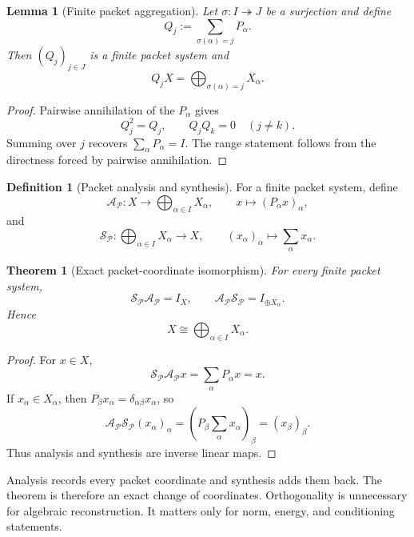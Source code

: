 \documentclass[11pt]{article}
\newtheorem{theorem}{Theorem}[section]
\newtheorem{lemma}[lemma]{Lemma}
\theoremstyle{definition}
\newtheorem{definition}[definition]{Definition}
\theoremstyle{remark}
\theoremstyle{definition}\newtheorem{example}[theorem]{Example}
\newcommand{\Pcal}{\mathcal P}
\newcommand{\RecordID}[1]{\label{record:#1}}
\newcommand{\Depends}[1]{}
\newcommand{\Exports}[1]{}
\begin{document}
\begin{lemma}[Finite packet aggregation]
\label{lem:packet-aggregation}
Let $\sigma:I\twoheadrightarrow J$ be a surjection and define
\[
Q_j:=\sum_{\sigma(\alpha)=j}P_\alpha.
\]
Then $(Q_j)_{j\in J}$ is a finite packet system and
\[
Q_jX=\bigoplus_{\sigma(\alpha)=j}X_\alpha.
\]
\end{lemma}
\RecordID{PSC-I-L-PACKET-AGGREGATION}
\Depends{PSC-I-D-PACKET-SYSTEM.}

\begin{proof}
Pairwise annihilation of the $P_\alpha$ gives
\[
Q_j^2=Q_j,
\qquad
Q_jQ_k=0\quad(j\neq k).
\]
Summing over $j$ recovers $\sum_\alpha P_\alpha=I$.  The range statement follows from the directness forced by pairwise annihilation.
\end{proof}

\begin{definition}[Packet analysis and synthesis]
\label{def:analysis-synthesis}
For a finite packet system, define
\[
\mathcal A_{\Pcal}:X\longrightarrow\bigoplus_{\alpha\in I}X_\alpha,
\qquad
x\longmapsto(P_\alpha x)_\alpha,
\]
and
\[
\mathcal S_{\Pcal}:\bigoplus_{\alpha\in I}X_\alpha\longrightarrow X,
\qquad
(x_\alpha)_\alpha\longmapsto\sum_\alpha x_\alpha.
\]
\end{definition}
\RecordID{PSC-I-D-ANALYSIS-SYNTHESIS}

\begin{theorem}[Exact packet-coordinate isomorphism]
\label{thm:exact-packet-coordinates}
For every finite packet system,
\[
\boxed{
\mathcal S_{\Pcal}\mathcal A_{\Pcal}=I_X,
\qquad
\mathcal A_{\Pcal}\mathcal S_{\Pcal}=I_{\oplus X_\alpha}.
}
\]
Hence
\[
\boxed{X\cong\bigoplus_{\alpha\in I}X_\alpha.}
\]
\end{theorem}
\RecordID{PSC-I-T-EXACT-PACKET-COORDINATES}
\Depends{PSC-I-D-PACKET-SYSTEM and PSC-I-D-ANALYSIS-SYNTHESIS.}
\Exports{Every exact packet reconstruction in the series.}

\begin{proof}
For $x\in X$,
\[
\mathcal S_{\Pcal}\mathcal A_{\Pcal}x
=
\sum_\alpha P_\alpha x
=x.
\]
If $x_\alpha\in X_\alpha$, then $P_\beta x_\alpha=\delta_{\alpha\beta}x_\alpha$, so
\[
\mathcal A_{\Pcal}\mathcal S_{\Pcal}(x_\alpha)_\alpha
=
\left(P_\beta\sum_\alpha x_\alpha\right)_\beta
=(x_\beta)_\beta.
\]
Thus analysis and synthesis are inverse linear maps.
\end{proof}

\begin{keyidea}
Analysis records every packet coordinate and synthesis adds them back.  The theorem is therefore an exact change of coordinates.  Orthogonality is unnecessary for algebraic reconstruction.  It matters only for norm, energy, and conditioning statements.
\end{keyidea}
\end{document}
